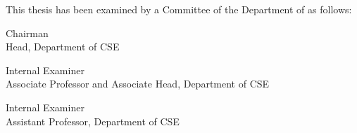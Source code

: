 This thesis has been examined by a Committee of the Department of \approvalcomdept as follows:

\vspace{3cm}
\signature{\textbf{Prof. Dr. Syed Akhter Hossain}}{%
    Chairman\\
    Head, Department of CSE\\
    \Diu
}

\vspace{3cm}
\signature{\textbf{Dr. Sheak Rashed Haider Noori}}{%
    Internal Examiner\\
    Associate Professor and Associate Head, Department of CSE\\
    \Diu
}

\vspace{3cm}
\signature{\textbf{Md Zahid Hasan}}{%
    Internal Examiner\\
    Assistant Professor, Department of CSE\\
    \Diu
}
